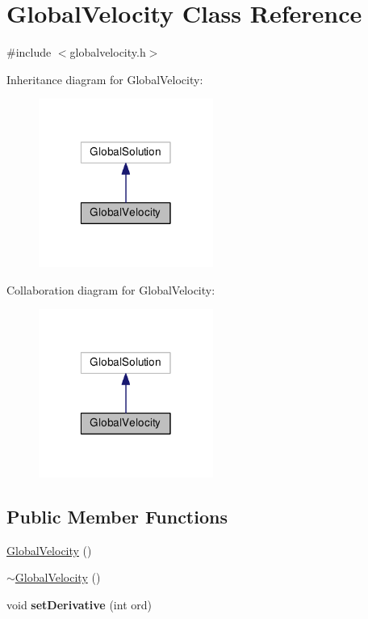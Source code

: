 \hypertarget{class_global_velocity}{\section{Global\-Velocity Class Reference}
\label{class_global_velocity}
}


{\ttfamily \#include $<$globalvelocity.\-h$>$}



Inheritance diagram for Global\-Velocity\-:
\nopagebreak
\begin{figure}[H]
\begin{center}
\leavevmode
\includegraphics[width=162pt]{class_global_velocity__inherit__graph}
\end{center}
\end{figure}


Collaboration diagram for Global\-Velocity\-:
\nopagebreak
\begin{figure}[H]
\begin{center}
\leavevmode
\includegraphics[width=162pt]{class_global_velocity__coll__graph}
\end{center}
\end{figure}
\subsection*{Public Member Functions}
\begin{DoxyCompactItemize}
\item 
\hyperlink{class_global_velocity_a444ab39b351acd4e6ca7dc8088e2a9b8}{Global\-Velocity} ()
\item 
\hyperlink{class_global_velocity_a2b8f719180b1786a582d90603db8f2d8}{$\sim$\-Global\-Velocity} ()
\item 
\hypertarget{class_global_velocity_a11229a6dbc7f85f3c321b5eddb127f10}{void {\bfseries set\-Derivative} (int ord)}\label{class_global_velocity_a11229a6dbc7f85f3c321b5eddb127f10}

\end{DoxyCompactItemize}


